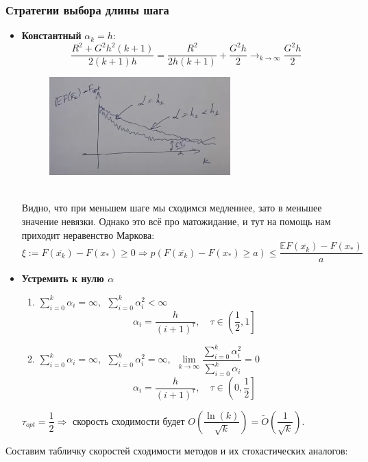 \subsubsection{Стратегии выбора длины шага}
\begin{itemize}
    \item \textbf{Константный} $\alpha_k = h$:
    \[
        \dfrac{R^2 + G^2 h^2 (k+1)}{2(k+1)h} = \dfrac{R^2}{2h(k+1)} + \dfrac{G^2 h}{2} \to_{k \to \infty} \dfrac{G^2 h}{2}
    \]
    \begin{figure}[h]
        \center
        \includegraphics[width=7cm]{images/sgd2.png}
    \end{figure}
    \\
    Видно, что при меньшем шаге мы сходимся медленнее, зато в меньшее значение невязки.
    Однако это всё про матожидание, и тут на помощь нам приходит неравенство Маркова:
    \[
        \xi := F(\overline{x_k}) - F(x_*) \geq 0 \Rightarrow p\left( F(\overline{x_k}) - F(x_*) \geq a \right) \leq \dfrac{\mathbb{E}F(\overline{x_k}) - F(x_*)}{a}
    \]
    \item \textbf{Устремить к нулю $\alpha$}
    \begin{enumerate}
        \item $\sum\limits_{i=0}^{k} \alpha_i = \infty, \ \ \sum\limits_{i=0}^{k} \alpha_i^2 < \infty$
        \[
            \alpha_i = \dfrac{h}{(i + 1)^{\tau}}, \quad \tau \in \left(\dfrac{1}{2}, 1\right]
        \]
        \item $\sum\limits_{i=0}^{k} \alpha_i = \infty, \ \ \sum\limits_{i=0}^{k} \alpha_i^2 = \infty, \ \ \lim\limits_{k \to \infty}\dfrac{\sum\limits_{i=0}^{k} \alpha_i^2}{\sum\limits_{i=0}^{k} \alpha_i} = 0$
        \[
            \alpha_i = \dfrac{h}{(i + 1)^{\tau}}, \quad \tau \in \left(0, \dfrac{1}{2}\right]
        \]
    \end{enumerate}
    $\tau_{opt} = \dfrac{1}{2} \Rightarrow$ скорость сходимости будет $O\left(\dfrac{\ln(k)}{\sqrt{k}}\right) = \tilde{O}\left(\dfrac{1}{\sqrt{k}}\right)$.
\end{itemize}
Составим табличку скоростей сходимости методов и их стохастических аналогов:
